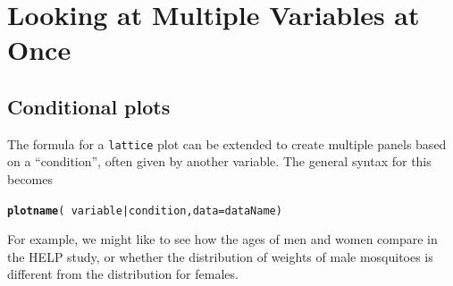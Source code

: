 \documentclass[twoside]{book}\usepackage[]{graphicx}\usepackage[]{xcolor}
\makeatletter
\newcommand{\hlopt}[1]{\textcolor[rgb]{0,0,0}{#1}}%
\newcommand{\hlstd}[1]{\textcolor[rgb]{0.345,0.345,0.345}{#1}}%
\newcommand{\hlkwc}[1]{\textcolor[rgb]{0.333,0.667,0.333}{#1}}%
\newcommand{\hlkwd}[1]{\textcolor[rgb]{0.737,0.353,0.396}{\textbf{#1}}}%
\newenvironment{kframe}{%
 \def\at@end@of@kframe{}%
 \ifinner\ifhmode%
  \def\at@end@of@kframe{\end{minipage}}%
  \begin{minipage}{\columnwidth}%
 \fi\fi%
 \def\FrameCommand##1{\hskip\@totalleftmargin \hskip-\fboxsep
 \colorbox{shadecolor}{##1}\hskip-\fboxsep
     \hskip-\linewidth \hskip-\@totalleftmargin \hskip\columnwidth}%
 \MakeFramed {\advance\hsize-\width
   \@totalleftmargin\z@ \linewidth\hsize
   \@setminipage}}%
 {\par\unskip\endMakeFramed%
 \at@end@of@kframe}
\newenvironment{knitrout}{}{} %
\newcommand{\Rindex}[1]{\index{\texttt{#1}}}
\newcommand{\pkg}[1]{{\color{red!80!black}\texttt{#1}}\Rindex{#1}}
\newcounter{example}[section]
\makeatother
\begin{document}
\section{Looking at Multiple Variables at Once}

\subsection{Conditional plots}
The formula for a \pkg{lattice} plot can be extended to create multiple
panels based on a ``condition'', often given by another variable.  The 
general syntax for this becomes
\begin{knitrout}
\color{fgcolor}\begin{kframe}
\begin{alltt}
\hlkwd{plotname}\hlstd{(}\hlopt{~}\hlstd{variable} \hlopt{|} \hlstd{condition,} \hlkwc{data} \hlstd{= dataName)}
\end{alltt}
\end{kframe}
\end{knitrout}

For example, we might like to see how the ages of men and women compare 
in the HELP study, or whether the distribution of weights of male mosquitoes 
is different from the distribution for females.
\end{document}
